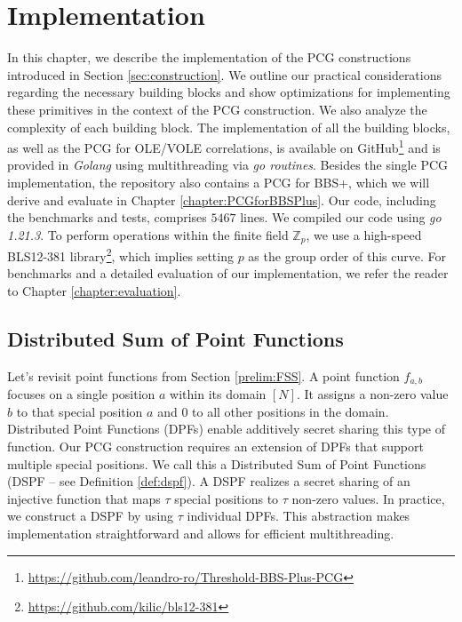 \chapter{Implementation}
\label{chapter:ImplementingPCGs}
In this chapter, we describe the implementation of the PCG constructions introduced in Section \ref{sec:construction}. We outline our practical considerations regarding the necessary building blocks and show optimizations for implementing these primitives in the context of the PCG construction. We also analyze the complexity of each building block. The implementation of all the building blocks, as well as the PCG for OLE/VOLE correlations, is available on GitHub\footnote{\url{https://github.com/leandro-ro/Threshold-BBS-Plus-PCG}} and is provided in \textit{Golang} using multithreading via \textit{go routines}. Besides the single PCG implementation, the repository also contains a PCG for BBS+, which we will derive and evaluate in Chapter \ref{chapter:PCGforBBSPlus}. Our code, including the benchmarks and tests, comprises $5467$
lines. We compiled our code using \textit{go 1.21.3}. To perform operations within the finite field $\mathbb{Z}_p$, we use a high-speed BLS12-381 library\footnote{\url{https://github.com/kilic/bls12-381}}, which implies setting $p$ as the group order of this curve. For benchmarks and a detailed evaluation of our implementation, we refer the reader to Chapter \ref{chapter:evaluation}.

\section{Distributed Sum of Point Functions}
\label{sec:dspfImplementation}
Let's revisit point functions from Section \ref{prelim:FSS}.  A point function $f_{a,b}$ focuses on a single position $a$ within its domain $[N]$. It assigns a non-zero value $b$ to that special position $a$ and $0$ to all other positions in the domain. Distributed Point Functions (DPFs) enable additively secret sharing this type of function. Our PCG construction requires an extension of DPFs that support multiple special positions. We call this a Distributed Sum of Point Functions (DSPF – see Definition \ref{def:dspf}). A DSPF realizes a secret sharing of an injective function that maps $\tau$ special positions to $\tau$ non-zero values. In practice, we construct a DSPF by using $\tau$ individual DPFs. This abstraction makes implementation straightforward and allows for efficient multithreading.

